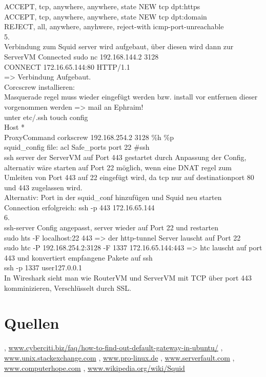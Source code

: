 \documentclass[12pt]{article}
\theoremstyle{plain}
\begin{document}
ACCEPT, tcp, anywhere, anywhere, state NEW tcp dpt:https\\
ACCEPT, tcp, anywhere, anywhere, state NEW tcp dpt:domain\\
REJECT, all, anywhere, anyhwere, reject-with icmp-port-unreachable\\
5.\\
Verbindung zum Squid server wird aufgebaut, über diesen wird dann zur ServerVM Connected
sudo nc 192.168.144.2 3128\\
CONNECT 172.16.65.144:80 HTTP/1.1\\
=> Verbindung Aufgebaut.\\
Corcscrew installieren:\\
Masquerade regel muss wieder eingefügt werden bzw. install vor entfernen dieser vorgenommen werden => mail an Ephraim!\\
unter etc/.ssh touch config\\
Host *\\
ProxyCommand corkscrew 192.168.254.2 3128 \%h \%p\\
squid\_config file: acl Safe\_ports port 22 \#ssh\\
ssh server der ServerVM auf Port 443 gestartet durch Anpassung der Config, alternativ wäre starten auf Port 22 möglich, wenn eine DNAT regel zum Umleiten von Port 443 auf 22 eingefügt wird, da tcp nur auf destinationport 80 und 443 zugelassen wird.\\
Alternativ: Port in der squid\_conf hinzufügen und Squid neu starten\\
Connection erfolgreich: ssh -p 443 172.16.65.144\\
6.\\
ssh-server Config angepasst, server wieder auf Port 22 und restarten\\
sudo hts -F localhost:22 443 => der http-tunnel Server lauscht auf Port 22\\
sudo htc -P 192.168.254.2:3128 -F 1337 172.16.65.144:443 => htc lauscht auf port 443 und konvertiert empfangene Pakete auf ssh\\
ssh -p 1337 user\@127.0.0.1\\
In Wireshark sieht man wie RouterVM und ServerVM mit TCP über port 443 komminizieren, Verschlüsselt durch SSL.\\
\section{Quellen}
\begin{thebibliography}{50}
\bibitem  [Cyberciti], \url{www.cyberciti.biz/faq/how-to-find-out-default-gateway-in-ubuntu/}
\bibitem [Stackexchange] , \url{www.unix.stackexchange.com}
, \url{www.pro-linux.de}
\bibitem [Serverfault], \url{www.serverfault.com}
\bibitem [computerhope], \url{www.computerhope.com}
\bibitem[Wikipedia], \url{www.wikipedia.org/wiki/Squid}
\end{thebibliography}
\end{document}
